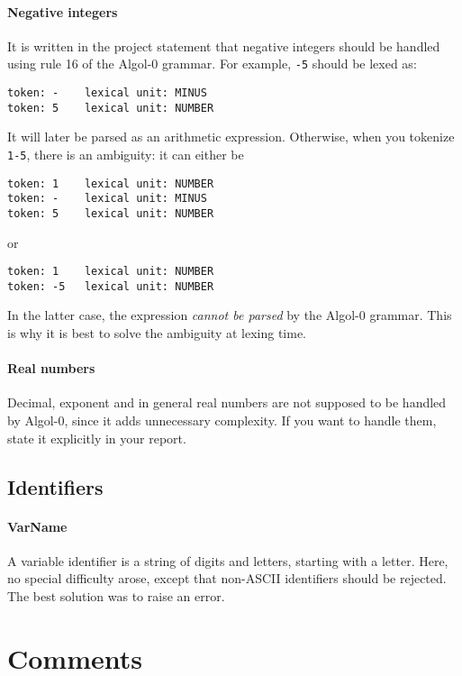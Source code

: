 \documentclass[a4paper]{article}
\newcommand{\mylanguage}{{\sc Algol-${0}$}\xspace}
\begin{document}
\paragraph{Negative integers}

It is written in the project statement that negative integers should be handled using rule 16 of the \mylanguage grammar. For example, \texttt{-5} should be lexed as:
 
\begin{verbatim}
token: -	lexical unit: MINUS
token: 5	lexical unit: NUMBER
\end{verbatim}

It will later be parsed as an arithmetic expression. Otherwise, when you tokenize \texttt{1-5}, there is an ambiguity: it can either be

\begin{verbatim}
token: 1	lexical unit: NUMBER
token: -	lexical unit: MINUS
token: 5	lexical unit: NUMBER
\end{verbatim}

or

\begin{verbatim}
token: 1	lexical unit: NUMBER
token: -5	lexical unit: NUMBER
\end{verbatim}

In the latter case, the expression \emph{cannot be parsed} by the \mylanguage grammar. This is why it is best to solve the ambiguity at lexing time.

\paragraph{Real numbers}
Decimal, exponent and in general real numbers are not supposed to be handled by \mylanguage, since it adds unnecessary complexity. If you want to handle them, state it explicitly in your report.

\subsection{Identifiers}
\paragraph{VarName} A variable identifier is a string of digits and letters, starting with a letter. Here, no special difficulty arose, except that non-ASCII identifiers should be rejected. The best solution was to raise an error.


\section{Comments}
\end{document}
